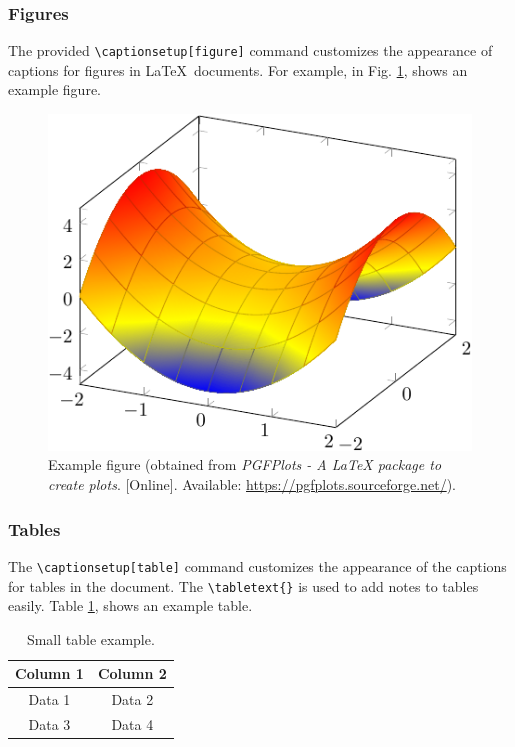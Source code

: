 \documentclass[9pt,a4paper,twoside]{tau}
\begin{document}
        \subsubsection{Figures}

            The provided \verb*|\captionsetup[figure]| command customizes the appearance of captions for figures in \LaTeX\ documents. For example, in Fig. \ref{fig:figure}, shows an example figure.
			
            \begin{figure}[H]
                \centering
                \includegraphics[width=0.8\columnwidth]{Figures/Example.pdf}
                \caption{Example figure (obtained from \textit{PGFPlots - A LaTeX package to create plots}. [Online]. Available: \url{https://pgfplots.sourceforge.net/}).}
                \label{fig:figure}
            \end{figure}

        \subsubsection{Tables}
    
            The \verb*|\captionsetup[table]| command customizes the appearance of the captions for tables in the document. The \verb*|\tabletext{}| is used to add notes to tables easily. Table \ref{tab:table}, shows an example table.
            
            \begin{table}[H]
                \centering
                \caption{Small table example.}
    		\label{tab:table}
                \begin{tabular}{cc}
            	\toprule
                    \textbf{Column 1} & \textbf{Column 2} \\
                    \midrule
                    Data 1 & Data 2 \\
                    Data 3 & Data 4 \\
                    \bottomrule
                \end{tabular}
                    
                    
            \end{table}
\end{document}
